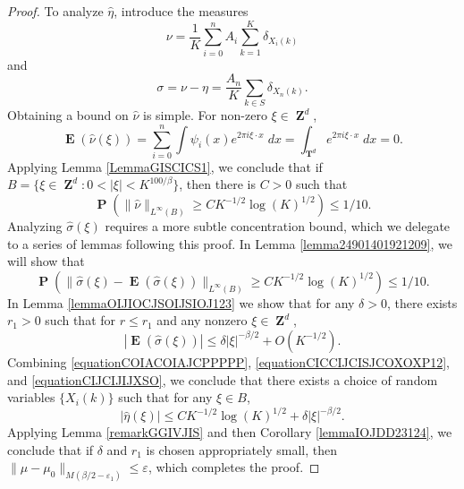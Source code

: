 \documentclass[dvipsnames,letterpaper,12pt]{article}
\numberwithin{equation}{section}
\DeclareMathOperator{\ZZ}{\mathbf{Z}}
\DeclareMathOperator{\TT}{\mathbf{T}}
\numberwithin{theorem}{section}
\DeclareMathOperator{\EE}{\mathbf{E}}
\DeclareMathOperator{\PP}{\mathbf{P}}
\begin{document}
\begin{proof}
    To analyze $\widehat{\eta}$, introduce the measures
    \[ \nu = \frac{1}{K} \sum_{i = 0}^n A_i \sum_{k = 1}^K \delta_{X_i(k)} \]
    and
    \[ \sigma = \nu - \eta = \frac{A_n}{K} \sum_{k \in S} \delta_{X_n(k)}. \]
    Obtaining a bound on $\widehat{\nu}$ is simple. For non-zero $\xi \in \ZZ^d$,
    \begin{equation}
        \EE(\widehat{\nu}(\xi)) = \sum_{i = 0}^n \int \psi_i(x) e^{2 \pi i \xi \cdot x}\; dx = \int_{\TT^d} e^{2 \pi i \xi \cdot x}\; dx = 0.
    \end{equation}
    Applying Lemma \ref{LemmaGISCICS1}, we conclude that if $B = \{ \xi \in \ZZ^d: 0 < |\xi| < K^{100/\beta} \}$, then there is $C > 0$ such that
    \begin{equation} \label{equationCOIACOIAJCPPPPP}
        \PP \left( \| \widehat{\nu} \|_{L^\infty(B)} \geq C K^{-1/2} \log(K)^{1/2} \right) \leq 1/10.
    \end{equation}
    Analyzing $\widehat{\sigma}(\xi)$ requires a more subtle concentration bound, which we delegate to a series of lemmas following this proof. In Lemma \ref{lemma24901401921209}, we will show that
    \begin{equation} \label{equationCICCIJCISJCOXOXP12}
        \PP \left( \| \widehat{\sigma}(\xi) - \EE(\widehat{\sigma}(\xi)) \|_{L^\infty(B)} \geq C K^{-1/2} \log(K)^{1/2} \right) \leq 1/10.
    \end{equation}
    In Lemma \ref{lemmaOIJIOCJSOIJSIOJ123} we show that for any $\delta > 0$, there exists $r_1 > 0$ such that for $r \leq r_1$ and any nonzero $\xi \in \ZZ^d$,
    \begin{equation} \label{equationCIJCIJIJXSO}
        |\EE(\widehat{\sigma}(\xi))| \leq \delta |\xi|^{-\beta/2} + O(K^{-1/2}).
    \end{equation}
    Combining \eqref{equationCOIACOIAJCPPPPP}, \eqref{equationCICCIJCISJCOXOXP12}, and \eqref{equationCIJCIJIJXSO}, we conclude that there exists a choice of random variables $\{ X_i(k) \}$ such that for any $\xi \in B$,
    \begin{equation}
        |\widehat{\eta}(\xi)| \leq C K^{-1/2} \log(K)^{1/2} + \delta |\xi|^{-\beta/2}.
    \end{equation}
    Applying Lemma \ref{remarkGGIVJIS} and then Corollary \ref{lemmaIOJDD23124}, we conclude that if $\delta$ and $r_1$ is chosen appropriately small, then $\| \mu - \mu_0 \|_{M(\beta/2 - \varepsilon_1)} \leq \varepsilon$, which completes the proof.
\end{proof}
\end{document}
